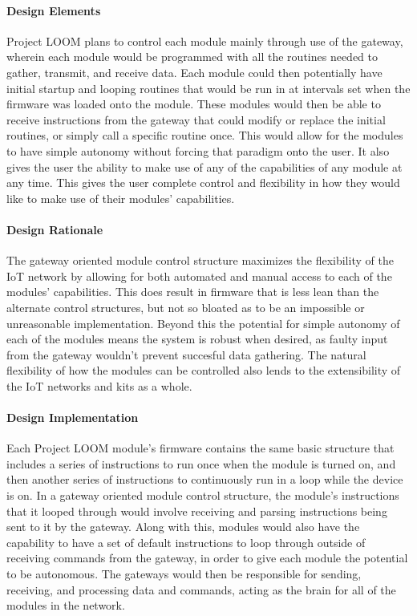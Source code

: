 \documentclass[onecolumn, draftclsnofoot,10pt, compsoc]{IEEEtran}
\begin{document}
\paragraph{Design Elements}
    Project LOOM plans to control each module mainly through use of the gateway, wherein each module would be programmed with all the routines needed to gather, transmit, and receive data. Each module could then potentially have initial startup and looping routines that would be run in at intervals set when the firmware was loaded onto the module. These modules would then be able to receive instructions from the gateway that could modify or replace the initial routines, or simply call a specific routine once. This would allow for the modules to have simple autonomy without forcing that paradigm onto the user. It also gives the user the ability to make use of any of the capabilities of any module at any time. This gives the user complete control and flexibility in how they would like to make use of their modules' capabilities.

\paragraph{Design Rationale}
    The gateway oriented module control structure maximizes the flexibility of the IoT network by allowing for both automated and manual access to each of the modules' capabilities. This does result in firmware that is less lean than the alternate control structures, but not so bloated as to be an impossible or unreasonable implementation. Beyond this the potential for simple autonomy of each of the modules means the system is robust when desired, as faulty input from the gateway wouldn't prevent succesful data gathering. The natural flexibility of how the modules can be controlled also lends to the extensibility of the IoT networks and kits as a whole. 

\paragraph{Design Implementation}
    Each Project LOOM module's firmware contains the same basic structure that includes a series of instructions to run once when the module is turned on, and then another series of instructions to continuously run in a loop while the device is on. In a gateway oriented module control structure, the module's instructions that it looped through would involve receiving and parsing instructions being sent to it by the gateway. Along with this, modules would also have the capability to have a set of default instructions to loop through outside of receiving commands from the gateway, in order to give each module the potential to be autonomous. The gateways would then be responsible for sending, receiving, and processing data and commands, acting as the brain for all of the modules in the network. 
\end{document}
